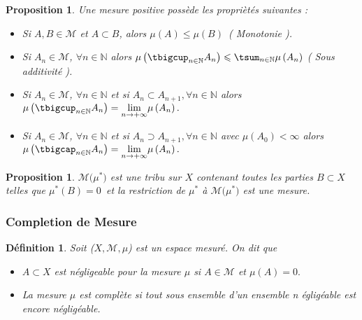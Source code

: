 \documentclass[3pt]{article}
\newtheorem{definition}[theorem]{D\'{e}finition}
\newtheorem{proposition}[theorem]{Proposition}
\begin{document}
\bigskip

\begin{proposition}
Une mesure positive poss\`{e}de les propri\`{e}t\'{e}s suivantes :

\begin{itemize}
\item Si $A,B\in \mathcal{M}$ et $A\subset B$, alors $\mu (A)\leqslant \mu
\left( B\right) $\ ( Monotonie ).

\item Si $A_{n}\in \mathcal{M}$, $\forall n\in \mathbb{N}$ alors $\mu \left(
\tbigcup_{n\in \mathbb{N}}A_{n}\right) \leqslant \tsum_{n\in \mathbb{N}}\mu
\left( A_{n}\right) $ ( Sous additivit\'{e} ).

\item Si $A_{n}\in \mathcal{M}$, $\forall n\in \mathbb{N}$ et si $%
A_{n}\subset A_{n+1},\forall n\in \mathbb{N}$ alors $\mu \left(
\tbigcup_{n\in \mathbb{N}}A_{n}\right) =\underset{n\rightarrow +\infty }{%
\lim }\mu \left( A_{n}\right) .$

\item Si $A_{n}\in \mathcal{M}$, $\forall n\in \mathbb{N}$ et si $%
A_{n}\supset A_{n+1},\forall n\in \mathbb{N}$ avec $\mu \left( A_{0}\right)
<\infty $ alors $\mu \left( \tbigcap_{n\in \mathbb{N}}A_{n}\right) =\underset%
{n\rightarrow +\infty }{\lim }\mu \left( A_{n}\right) .$
\end{itemize}
\end{proposition}

\bigskip

\begin{proposition}
$\mathcal{M(}\mu ^{\ast }\mathcal{)}$ est une tribu sur $X$ contenant toutes
les parties $B\subset X$ telles que $\mu ^{\ast }\left( B\right) =0$\ et la
restriction de $\mu ^{\ast }$ \`{a} $\mathcal{M(}\mu ^{\ast }\mathcal{)}$
est une mesure.
\end{proposition}

\subsubsection{Completion de Mesure}

\bigskip

\begin{definition}
Soit ($X,\mathcal{M},\mu $) est un espace mesur\'{e}. On dit que

\begin{itemize}
\item $A\subset X$ est n\'{e}gligeable pour la mesure $\mu $ si $A\in 
\mathcal{M}$ et $\mu (A)=0.$

\item La mesure $\mu $ est compl\`{e}te si tout sous ensemble d'un ensemble n%
\'{e}glig\'{e}able est encore n\'{e}glig\'{e}able.
\end{itemize}
\end{definition}
\end{document}
